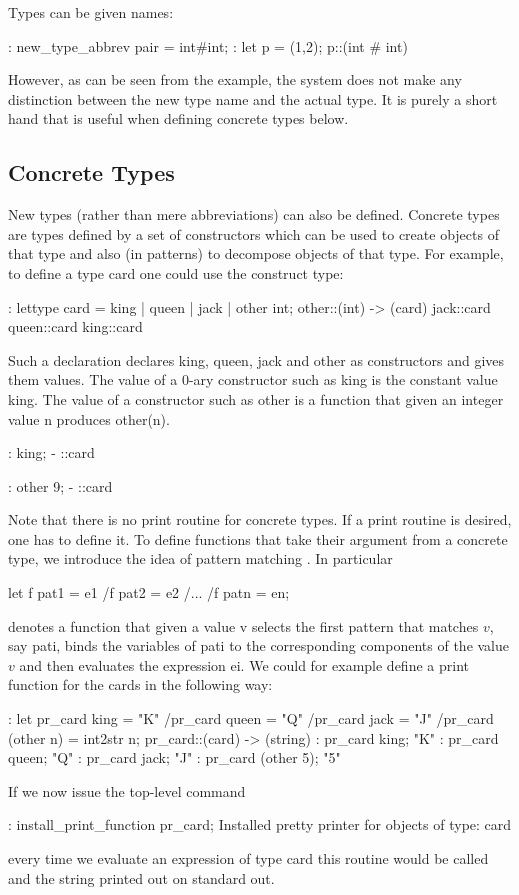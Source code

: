 Types can be given names:
\begin{hol}
: new\_type\_abbrev pair = int#int;
: let p = (1,2);
p::(int # int)
\end{hol}
However, as can be seen from the example, the system does not
make any distinction between the new type name
and the actual type. It is purely a short hand that is useful when
defining concrete types below.

\subsection{Concrete Types}

New types (rather than mere abbreviations) can also be defined.
Concrete types%
%
{} are types
defined by a set of constructors%
%
{} which can be used to create objects
of that type and also (in
patterns) to decompose objects of that type. For example, to define
a type card one could use the
construct type:
\begin{hol}
: lettype card = king | queen | jack | other int;
other::(int) -> (card)
jack::card
queen::card
king::card
\end{hol}
Such a declaration declares king, queen, jack and other as constructors
and gives them
values. The value of a 0-ary constructor such as king is the constant
value king. The value of a
constructor such as other is a function that given an integer value
n produces other(n).
\begin{hol}
: king;
- ::card

: other 9;
- ::card
\end{hol}

Note that there is no print routine%
%
{} for concrete types. If a print
routine is desired, one has to
define it.
To define functions that take their argument from a concrete type,
we introduce the idea of pattern matching%
%
{}.
In particular
\begin{hol}
let f pat1 = e1
 /\verb@\@ f pat2 = e2
 /\verb@\@ ...
 /\verb@\@ f patn = en;
\end{hol}
denotes a function that given a value v selects the first pattern that
matches $v$, say pati, binds the variables of pati to
the corresponding components of the value $v$ and then evaluates the
expression ei.
We could for example define a print function for the cards in the following way:
\begin{hol}
: let pr\_card king = "K"
  /\verb@\@  pr\_card queen = "Q"
  /\verb@\@  pr\_card jack = "J"
  /\verb@\@  pr\_card (other n) = int2str n;
pr\_card::(card) -> (string)
: pr\_card king;
"K"
: pr\_card queen;
"Q"
: pr\_card jack;
"J"
: pr\_card (other 5);
"5"
\end{hol}
If we now issue the top-level command 
\begin{hol}
: install\_print\_function pr\_card;
Installed pretty printer for objects of type: card
\end{hol}
every time we evaluate an expression of type card this routine would
be called and the string printed out on standard out.

